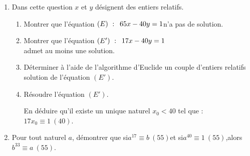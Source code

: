 \documentclass{cornouaille}
\begin{document}
\begin{exercice}
\begin{enumerate}
\item Dans cette question $x$ et $y$ désignent des entiers relatifs.
\begin{enumerate}
\item Montrer que l'équation $(E)~:\enskip 65x - 40y = 1$\enskip n'a pas de solution.\medskip

\item Montrer que l'équation $(E')~:\enskip 17x - 40y = 1$\\ admet au moins une  solution.\medskip

\item Déterminer à l'aide de l'algorithme d'Euclide un couple d'entiers relatifs solution de l'équation $\left(E'\right)$.
	
\item Résoudre l'équation $\left(E'\right)$.
	
En déduire qu'il existe un unique naturel $x_{0}<40$ tel que : $17x_{0}\equiv 1~(40)$.\medskip
	\end{enumerate}
	
\item Pour tout naturel $a$, démontrer que si\enskip $a^{17} \equiv b~(55)$\enskip et si\enskip $a^{40} \equiv 1~(55)$,\enskip alors\enskip $b^{33} \equiv a~(55)$.
\end{enumerate}
\end{exercice}

\end{document}
